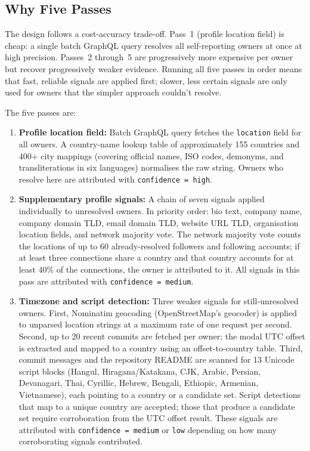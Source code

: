 \subsection{Why Five Passes}

The design follows a cost-accuracy trade-off. Pass~1 (profile location field) is cheap: a single batch GraphQL query resolves all self-reporting owners at once at high precision. Passes~2 through~5 are progressively more expensive per owner but recover progressively weaker evidence. Running all five passes in order means that fast, reliable signals are applied first; slower, less certain signals are only used for owners that the simpler approach couldn't resolve.

The five passes are:

\begin{enumerate}
  \item \textbf{Profile location field:} Batch GraphQL query fetches the \texttt{location} field for all owners. A country-name lookup table of approximately 155 countries and 400+ city mappings (covering official names, ISO codes, demonyms, and transliterations in six languages) normalises the raw string. Owners who resolve here are attributed with \texttt{confidence = high}.

  \item \textbf{Supplementary profile signals:} A chain of seven signals applied individually to unresolved owners. In priority order: bio text, company name, company domain TLD, email domain TLD, website URL TLD, organisation location fields, and network majority vote. The network majority vote counts the locations of up to 60 already-resolved followers and following accounts; if at least three connections share a country and that country accounts for at least 40\% of the connections, the owner is attributed to it. All signals in this pass are attributed with \texttt{confidence = medium}.

  \item \textbf{Timezone and script detection:} Three weaker signals for still-unresolved owners. First, Nominatim geocoding (OpenStreetMap's geocoder) is applied to unparsed location strings at a maximum rate of one request per second. Second, up to 20 recent commits are fetched per owner; the modal UTC offset is extracted and mapped to a country using an offset-to-country table. Third, commit messages and the repository README are scanned for 13 Unicode script blocks (Hangul, Hiragana/Katakana, CJK, Arabic, Persian, Devanagari, Thai, Cyrillic, Hebrew, Bengali, Ethiopic, Armenian, Vietnamese), each pointing to a country or a candidate set. Script detections that map to a unique country are accepted; those that produce a candidate set require corroboration from the UTC offset result. These signals are attributed with \texttt{confidence = medium} or \texttt{low} depending on how many corroborating signals contributed.


\end{enumerate}
